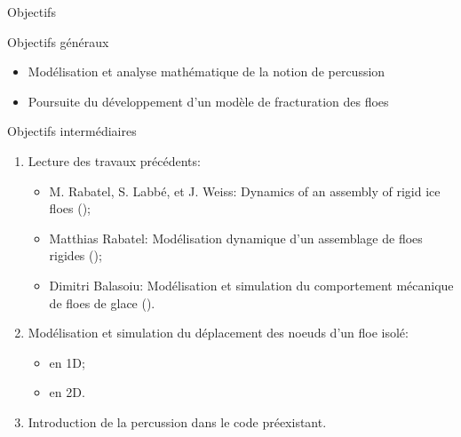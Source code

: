
\begin{frame}{Objectifs}

  \begin{exampleblock}{Objectifs généraux}

    \begin{itemize}
      \item Modélisation et analyse mathématique de la notion de percussion
      \item Poursuite du développement d’un modèle de fracturation des floes
    \end{itemize}
  \end{exampleblock}


  \begin{block}{Objectifs intermédiaires}

    \begin{enumerate}
      \item Lecture des travaux précédents:
      \begin{itemize}
        \item \alert{M. Rabatel, S. Labbé, et J. Weiss}: Dynamics of an assembly of rigid ice floes (\citeyear{rabatel2015dynamics}); 
        \item \alert{Matthias Rabatel}: Modélisation dynamique d’un assemblage de floes rigides (\citeyear{rabatel2015modelisation});
        \item \alert{Dimitri Balasoiu}: Modélisation et simulation du comportement mécanique de floes de glace (\citeyear{balasoiu2020modelisation}).
      \end{itemize}
      
      \item Modélisation et simulation du déplacement des noeuds d'un floe isolé:
      \begin{itemize}
        \item en 1D;
        \item en 2D.
      \end{itemize}

      \item Introduction de la percussion dans le code préexistant.

    \end{enumerate}
  \end{block}

\end{frame}
